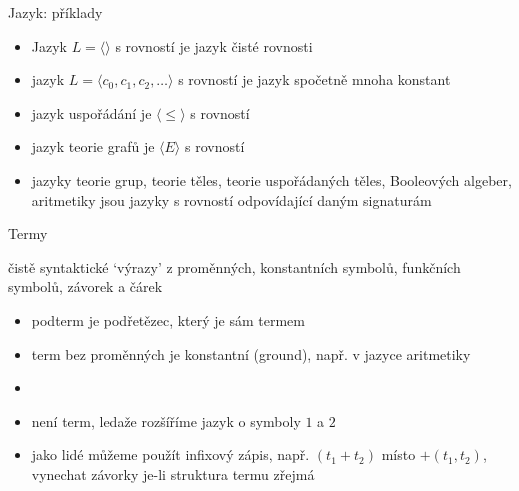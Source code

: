\documentclass{beamer}
\begin{document}
\begin{frame}{Jazyk: příklady}

    
    \begin{itemize}
        \item Jazyk \alert{$L=\langle\rangle$ s rovností} je jazyk \alert{čisté rovnosti}
        \item jazyk $L=\langle c_0,c_1,c_2,\dots\rangle$ s rovností je jazyk \alert{spočetně mnoha konstant}
        \item jazyk \alert{uspořádání} je $\langle \leq \rangle$ s rovností
        \item jazyk \alert{teorie grafů} je $\langle E \rangle$ s rovností
        \item jazyky \alert{teorie grup, teorie těles, teorie uspořádaných těles, Booleových algeber, aritmetiky} jsou jazyky \alert{s rovností} odpovídající daným signaturám
    \end{itemize}
    
\end{frame}


\begin{frame}{Termy}

    \alert{čistě syntaktické} `výrazy' z proměnných, konstantních symbolů, funkčních symbolů, závorek a čárek
    

    \begin{itemize}
        \item \alert{podterm} je podřetězec, který je sám termem
        \item term bez proměnných je \alert{konstantní (ground)}, např.  v jazyce aritmetiky
        \item {}
        \item {} \alert{není} term, ledaže rozšíříme jazyk o \alert{symboly} $1$ a $2$
        \item jako lidé můžeme použít \alert{infixový} zápis, např. $(t_1+t_2)$ místo $+(t_1,t_2)$, vynechat závorky je-li struktura termu zřejmá
    \end{itemize}

\end{frame}
\end{document}
